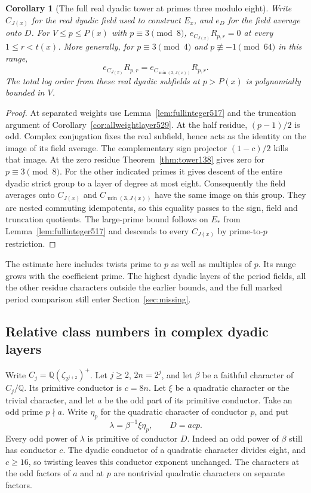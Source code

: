 \documentclass[a4paper,11pt]{article}
\newtheorem{corollary}[proposition]{Corollary}
\theoremstyle{definition}
\theoremstyle{remark}
\numberwithin{equation}{section}
\begin{document}
\begin{corollary}[The full real dyadic tower at primes three modulo eight]
\leavevmode\label{cor:fullreal529}
Write \(C_{J(x)}\) for the real dyadic field used to construct
\(E_x\), and \(e_D\) for the field average onto \(D\).
For \(V\le p\le P(x)\) with \(p\equiv3\pmod8\),
\(e_{C_{J(x)}}R_{p,r}=0\) at every \(1\le r<t(x)\).
More generally, for \(p\equiv3\pmod4\) and
\(p\not\equiv-1\pmod{64}\) in this range,
\[
       e_{C_{J(x)}}R_{p,r}=e_{C_{\min(3,J(x))}}R_{p,r}.
\]
The total log order from these real dyadic subfields at \(p>P(x)\)
is polynomially bounded in \(V\).
\end{corollary}
\begin{proof}
At separated weights use Lemma~\ref{lem:fullinteger517} and the
truncation argument of Corollary~\ref{cor:allweightlayer529}.
At the half residue, \((p-1)/2\) is odd. Complex conjugation
fixes the real subfield, hence acts as the identity on the image
of its field average. The complementary sign projector \((1-c)/2\)
kills that image. At the zero residue
Theorem~\ref{thm:tower138} gives zero for \(p\equiv3\pmod8\).
For the other indicated primes it gives descent of the entire
dyadic strict group to a layer of degree at most eight.
Consequently the field averages onto \(C_{J(x)}\) and
\(C_{\min(3,J(x))}\) have the same image on this group.
They are nested commuting idempotents, so this equality passes
to the sign, field and truncation quotients. The large-prime
bound follows on \(E_*\) from Lemma~\ref{lem:fullinteger517}
and descends to every \(C_{J(x)}\) by prime-to-\(p\) restriction.
\end{proof}

The estimate here includes twists prime to \(p\) as well as multiples
of \(p\). Its range grows with the coefficient prime. The highest
dyadic layers of the period fields, all the other residue characters
outside the earlier bounds, and the full marked period comparison
still enter Section~\ref{sec:missing}.


\subsection{Relative class numbers in complex dyadic layers}
\label{sec:complexdyadic542}

Write \(C_j=\mathbb Q(\zeta_{2^{j+2}})^+\). Let \(j\ge2\),
\(2n=2^j\), and let \(\beta\) be a faithful character of
\(C_j/\mathbb Q\). Its primitive conductor is \(c=8n\).
Let \(\xi\) be a quadratic character or the trivial character,
and let \(a\) be the odd part of its primitive conductor.
Take an odd prime \(p\nmid a\). Write \(\eta_p\) for the
quadratic character of conductor \(p\), and put
\[
             \lambda=\beta^{-1}\xi\eta_p,\qquad D=acp .
\]
Every odd power of \(\lambda\) is primitive of conductor \(D\).
Indeed an odd power of \(\beta\) still has conductor \(c\).
The dyadic conductor of a quadratic character divides eight,
and \(c\ge16\), so twisting leaves this conductor exponent
unchanged. The characters at the odd factors of \(a\) and
at \(p\) are nontrivial quadratic characters on separate factors.
\end{document}

